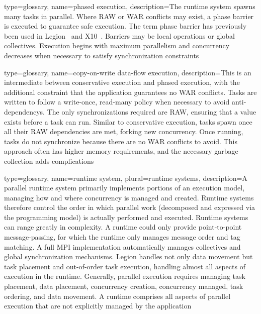 {
  type=glossary,
  name={phased execution},
  description={The \gls{runtime system} spawns many tasks in parallel.  Where
    \gls{RAW} or \gls{WAR} conflicts may 
  exist, a \gls{phase barrier} is executed to guarantee safe execution. The
  term \gls{phase barrier} has previously 
  been used in Legion~\cite{LegionThesis} and X10~\cite{X10Phasers}. Barriers may be local operations 
  or global collectives.  Execution begins with maximum parallelism and
  \gls{concurrency} decreases when 
  necessary to satisfy synchronization constraints}
}

{
  type=glossary,
  name={copy-on-write data-flow execution},
  description={This is an intermediate between \gls{conservative execution} and
    \gls{phased execution}, with the additional constraint that the application guarantees no 
    \gls{WAR} conflicts.  Tasks are written to follow a
    write-once, read-many policy when necessary to avoid \glspl{anti-dependency}.
    The only synchronizations required are \gls{RAW}, ensuring that a
    value exists before a task can run.  Similar to \gls{conservative
      execution},
    tasks spawn once all their \gls{RAW} dependencies are met, forking new
      \gls{concurrency}.  
    Once running, tasks do not synchronize because there are no \gls{WAR} conflicts
    to avoid.  This approach often has higher memory requirements, and the
    necessary garbage collection adds complications}
}

{
  type=glossary,
  name={runtime system},
  plural={runtime systems},
  description={A parallel runtime system primarily implements portions of an
  \gls{execution model}, managing how and where concurrency is managed and created. 
 Runtime systems therefore control the order in which parallel work (decomposed
     and expressed via the \gls{programming model}) is actually performed and executed.  Runtime systems can range greatly in complexity. A runtime could only provide point-to-point message-passing, for which the runtime only manages message order and tag matching. A full \gls{MPI} implementation automatically manages collectives and global synchronization mechanisms.
  Legion handles not only data movement but task placement and out-of-order task execution, handling almost all aspects of execution in the runtime.  Generally, parallel execution requires managing task placement, data placement, concurrency creation, concurrency managed, task ordering, and data movement. A runtime comprises all aspects of parallel execution that are not explicitly managed by the application}
}

